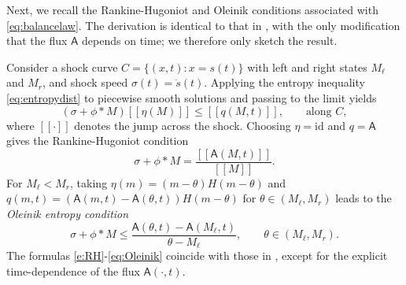 \documentclass[11pt,reqno]{amsart}
\theoremstyle{definition}
\theoremstyle{remark}
\def\A{\mathsf{A}}
\begin{document}
	Next, we recall the Rankine-Hugoniot and Oleinik conditions associated with \eqref{eq:balancelaw}. The derivation is identical to that in \cite{leslie2023sticky}, with the only modification that the flux $\A$ depends on time; we therefore only sketch the result.
	
	Consider a shock curve $C = \{(x,t): x = s(t)\}$ with left and right states $M_\ell$ and $M_r$, and shock speed $\sigma(t) = \dot{s}(t)$. Applying the entropy inequality \eqref{eq:entropydist} to piecewise smooth solutions and passing to the limit yields
	\[
	(\sigma + \phi\ast M)[[\eta(M)]] \le [[q(M,t)]],\qquad \text{along }C,
	\]
	where $[[\cdot]]$ denotes the jump across the shock. Choosing $\eta = \mathrm{id}$ and $q = \A$ gives the Rankine-Hugoniot condition
	\begin{equation}
		\label{e:RH}
		\sigma +\phi\ast M = \frac{[[\A(M,t)]]}{[[M]]}.
	\end{equation}
	For $M_\ell<M_r$, taking $\eta(m) = (m-\theta) H(m-\theta)$ and 
	$q(m,t)=(\A(m,t)-\A(\theta,t))H(m-\theta)$ for $\theta\in(M_\ell, M_r)$ leads to the \emph{Oleinik entropy condition}
	\begin{equation}
		\label{eq:Oleinik}
		\sigma + \phi\ast M\le \frac{\A(\theta,t) - \A(M_\ell,t)}{\theta - M_\ell},
		\qquad \theta\in (M_\ell, M_r).
	\end{equation}
	The formulas \eqref{e:RH}-\eqref{eq:Oleinik} coincide with those in \cite{leslie2023sticky}, except for the explicit time-dependence of the flux $\A(\cdot,t)$.
	
\end{document}
